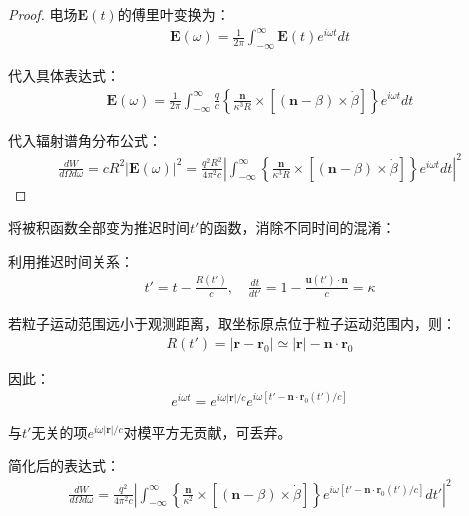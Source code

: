 \begin{proof}
电场$\mathbf{E}(t)$的傅里叶变换为：
\begin{align}
\mathbf{E}(\omega) = \frac{1}{2\pi} \int_{-\infty}^{\infty} \mathbf{E}(t) e^{i\omega t} dt
\end{align}

代入具体表达式：
\begin{align}
\mathbf{E}(\omega) = \frac{1}{2\pi} \int_{-\infty}^{\infty} \frac{q}{c} \left\{ \frac{\mathbf{n}}{\kappa^3 R} \times [(\mathbf{n}-\beta) \times \dot{\beta}] \right\} e^{i\omega t} dt
\end{align}

代入辐射谱角分布公式：
\begin{align}
\frac{dW}{d\Omega d\omega} = cR^2|\mathbf{E}(\omega)|^2 = \frac{q^2 R^2}{4\pi^2 c} \left| \int_{-\infty}^{\infty} \left\{ \frac{\mathbf{n}}{\kappa^3 R} \times [(\mathbf{n}-\beta) \times \dot{\beta}] \right\} e^{i\omega t} dt \right|^2
\end{align}
\end{proof}

\begin{derivationnote}[变量替换与简化]
将被积函数全部变为推迟时间$t'$的函数，消除不同时间的混淆：

利用推迟时间关系：
\begin{align}
t' = t - \frac{R(t')}{c}, \quad \frac{dt}{dt'} = 1 - \frac{\mathbf{u}(t') \cdot \mathbf{n}}{c} = \kappa
\end{align}

若粒子运动范围远小于观测距离，取坐标原点位于粒子运动范围内，则：
\begin{align}
R(t') = |\mathbf{r} - \mathbf{r}_0| \simeq |\mathbf{r}| - \mathbf{n} \cdot \mathbf{r}_0
\end{align}

因此：
\begin{align}
e^{i\omega t} = e^{i\omega |\mathbf{r}|/c} e^{i\omega [t' - \mathbf{n} \cdot \mathbf{r}_0(t')/c]}
\end{align}

与$t'$无关的项$e^{i\omega |\mathbf{r}|/c}$对模平方无贡献，可丢弃。

简化后的表达式：
\begin{align}
\frac{dW}{d\Omega d\omega} = \frac{q^2}{4\pi^2 c} \left| \int_{-\infty}^{\infty} \left\{ \frac{\mathbf{n}}{\kappa^2} \times [(\mathbf{n}-\beta) \times \dot{\beta}] \right\} e^{i\omega [t' - \mathbf{n} \cdot \mathbf{r}_0(t')/c]} dt' \right|^2
\end{align}
\end{derivationnote}

